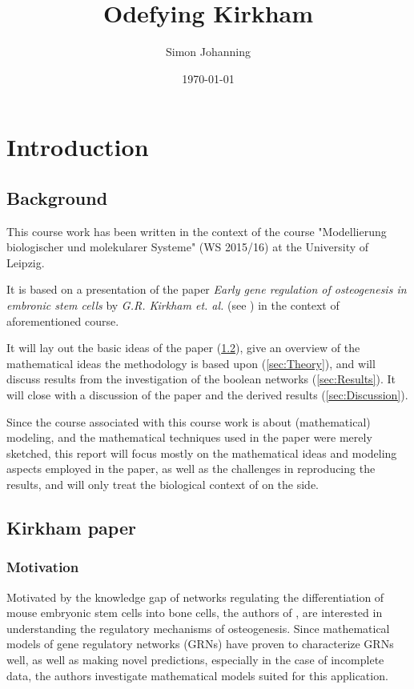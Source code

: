 \documentclass[11pt]{article}
\begin{document}
\title{Odefying Kirkham}
\author{Simon Johanning}
\date{\today}
\maketitle

\tableofcontents

\section{Introduction} \label{sec:Intro}
\subsection{Background}
This course work has been written in the context of the course "Modellierung biologischer und molekularer Systeme" (WS 2015/16) at the University of Leipzig.

It is based on a presentation of the paper \textit{Early gene regulation of osteogenesis in embronic stem cells} by \textit{G.R. Kirkham et. al.} (see \cite{Kirkham}) in the context of aforementioned course.

It will lay out the basic ideas of the paper (\ref{ssec:Kirkham}), give an overview of the mathematical ideas the methodology is based upon (\ref{sec:Theory}), and will discuss results from the investigation of the boolean networks (\ref{sec:Results}). It will close with a discussion of the paper and the derived results (\ref{sec:Discussion}).

Since the course associated with this course work is about (mathematical) modeling, and the mathematical techniques used in the paper were merely sketched, this report will focus mostly on the mathematical ideas and modeling aspects employed in the paper, as well as the challenges in reproducing the results, and will only treat the biological context of \cite{Kirkham} on the side.
\subsection{Kirkham paper} \label{ssec:Kirkham}
\subsubsection{Motivation}
Motivated by the knowledge gap of networks regulating the differentiation of mouse embryonic stem cells into bone cells, the authors of \cite{Kirkham}, are interested in understanding the regulatory mechanisms of osteogenesis.
Since mathematical models of gene regulatory networks (GRNs) have proven to characterize GRNs well, as well as making novel predictions, especially in the case of incomplete data, the authors investigate mathematical models suited for this application.
\end{document}
